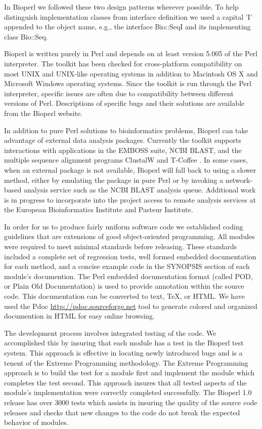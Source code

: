 \documentclass[12pt]{article}
\begin{document}
In Bioperl we followed these two design patterns \cite{gangoffour}
wherever possible.  To help distinguish implementation classes from
interface definition we used a capital 'I' appended to the object
name, e.g., the interface Bio::SeqI and its implementing class
Bio::Seq.

Bioperl is written purely in Perl and depends on at least version 5.005
of the Perl interpreter.  The toolkit has been checked
for cross-platform compatibility on most UNIX and UNIX-like operating
systems in addition to Macintosh OS X and Microsoft Windows operating
systems.  Since the toolkit is run through the Perl interpreter,
specific issues are often due to compatibility between different
versions of Perl.  Descriptions of specific bugs and their solutions
are available from the Bioperl website.

In addition to pure Perl solutions to bioinformatics problems, Bioperl
can take advantage of external data analysis packages.  Currently the
toolkit supports interactions with applications in the EMBOSS
\cite{emboss} suite, NCBI BLAST, and the multiple sequence alignment
programs ClustalW \cite{clustalw} and T-Coffee \cite{tcoffee}.  In
some cases, when an external package is not available, Bioperl will
fall back to using a slower method, either by emulating the package in
pure Perl or by invoking a network-based analysis service such as the
NCBI BLAST analysis queue.  Additional work is in progress to
incorporate into the project access to remote analysis services at the
European Bioinformatics Institute and Pasteur Institute.

In order for us to produce fairly uniform software code we established
coding guidelines that are extensions of good object-oriented
programming.  All modules were required to meet minimal standards
before releasing.  These standards included a complete set of
regression tests, well formed embedded documentation for each method,
and a concise example code in the SYNOPSIS section of each module's
documention.  The Perl embedded documentation format (called POD, or
Plain Old Documentation) is used to provide annotation within the
source code.  This documentation can be converted to text, TeX, or
HTML.  We have used the Pdoc \url{http://pdoc.sourceforge.net} tool to generate colored and
organized documention in HTML for easy online browsing.

The development process involves integrated testing of the code.  We
accomplished this by insuring that each module has a test in the
Bioperl test system.  This approach is effective in locating newly
introduced bugs and is a tenent of the Extreme
Programming\cite{xprogramming} methodology.  The Extreme Programming
approach is to build the test for a module first and implement the
module which completes the test second.  This approach insures that
all tested aspects of the module's implementation were correctly
completed successfully.  The Bioperl 1.0 release has over 3000 tests
which assists in insuring the quality of the source code releases and
checks that new changes to the code do not break the
expected behavior of modules.
\end{document}
